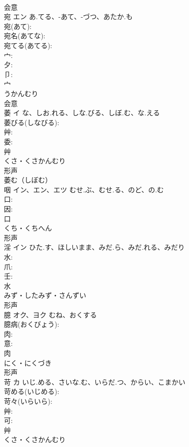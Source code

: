 \documentclass[8pt]{extreport}
\begin{document}
\begin{CJK}{UTF8}{min}
\\	会意 
\\	宛	エン	あ.てる、-あて、-づつ、あたか.も		
\\	宛(あて): 
\\	宛名(あてな): 
\\	宛てる(あてる): 
\\	宀: 
\\	夕: 
\\	卩: 
\\	宀	
\\	うかんむり	
\\	会意 
\\	萎	イ	な、しお.れる、しな.びる、しぼ.む、な.える		
\\	萎びる(しなびる): 
\\	艸: 
\\	委: 
\\	艸	
\\	くさ・くさかんむり	
\\	形声 
\\	萎む（しぼむ）
\\	咽	イン、エン、エツ	むせ.ぶ、むせ.る、のど、の.む		
\\	口: 
\\	因: 
\\	口	
\\	くち・くちへん	
\\	形声 
\\	淫	イン	ひた.す、ほしいまま、みだ.ら、みだ.れる、みだり		
\\	水: 
\\	爪: 
\\	壬: 
\\	水	
\\	みず・したみず・さんずい	
\\	形声 
\\	臆	オク、ヨク	むね、おくする		
\\	臆病(おくびょう): 
\\	肉: 
\\	意: 
\\	肉	
\\	にく・にくづき	
\\	形声 
\\	苛	カ	いじ.める、さいな.む、いらだ.つ、からい、こまかい		
\\	苛める(いじめる): 
\\	苛々(いらいら): 
\\	艸: 
\\	可: 
\\	艸	
\\	くさ・くさかんむり	

\end{CJK}
\end{document}
